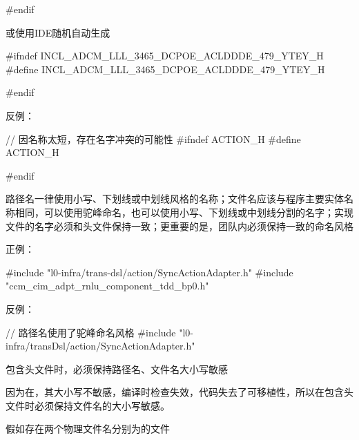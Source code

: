 \begin{content}
\begin{leftbar}
\begin{c++}
#endif
\end{c++}
\end{leftbar}

或使用IDE随机自动生成

\begin{leftbar}
\begin{c++}
#ifndef INCL_ADCM_LLL_3465_DCPOE_ACLDDDE_479_YTEY_H
#define INCL_ADCM_LLL_3465_DCPOE_ACLDDDE_479_YTEY_H

#endif
\end{c++}
\end{leftbar}

反例：
\begin{leftbar}
\begin{c++}
// 因名称太短，存在名字冲突的可能性
#ifndef ACTION_H
#define ACTION_H

#endif
\end{c++}
\end{leftbar}

\begin{regulation}
路径名一律使用小写、下划线或中划线风格的名称；文件名应该与程序主要实体名称相同，可以使用驼峰命名，也可以使用小写、下划线或中划线分割的名字；实现文件的名字必须和头文件保持一致；更重要的是，团队内必须保持一致的命名风格
\end{regulation}

正例：
\begin{leftbar}
\begin{c++}
#include "l0-infra/trans-dsl/action/SyncActionAdapter.h"
#include "ccm_cim_adpt_rnlu_component_tdd_bp0.h"
\end{c++}
\end{leftbar}

反例：
\begin{leftbar}
\begin{c++}
// 路径名使用了驼峰命名风格
#include "l0-infra/transDsl/action/SyncActionAdapter.h"
\end{c++}
\end{leftbar}

\begin{regulation}
包含头文件时，必须保持路径名、文件名大小写敏感
\end{regulation}

因为在，其大小写不敏感，编译时检查失效，代码失去了可移植性，所以在包含头文件时必须保持文件名的大小写敏感。

假如存在两个物理文件名分别为的文件


\end{content}
